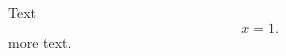 \documentclass{article}
\newcommand{\full}[1]{#1}
\begin{document}
Text
\full{$}$x=1.$\full{$}
more text.
\end{document}
